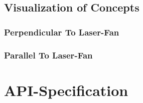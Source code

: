 \documentclass[letterpaper,10pt,english]{sphinxmanual}
\begin{document}
\subsection{Visualization of Concepts}
\label{\detokenize{module_sensor_model:visualization-of-concepts}}


\subsubsection{Perpendicular To Laser-Fan}
\label{\detokenize{module_sensor_model:perpendicular-to-laser-fan}}
\begin{figure}[htbp]
\centering

\noindent{}
\end{figure}


\subsubsection{Parallel To Laser-Fan}
\label{\detokenize{module_sensor_model:parallel-to-laser-fan}}
\begin{figure}[htbp]
\centering

\noindent{}
\end{figure}


\section{API-Specification}
\label{\detokenize{module_sensor_model:api-specification}}\label{\detokenize{module_sensor_model:module-agiprobot_measurement.sensor_model}}
\end{document}
